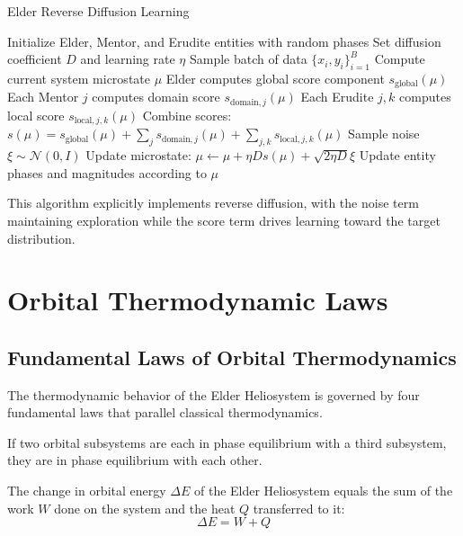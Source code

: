 \begin{algorithm}[h]
\caption{Elder Reverse Diffusion Learning}
\begin{algorithmic}[1]
\State Initialize Elder, Mentor, and Erudite entities with random phases
\State Set diffusion coefficient $D$ and learning rate $\eta$
\State Sample batch of data $\{x_i, y_i\}_{i=1}^B$
\State Compute current system microstate $\mu$
\State Elder computes global score component $s_{\text{global}}(\mu)$
\State Each Mentor $j$ computes domain score $s_{\text{domain},j}(\mu)$
\State Each Erudite $j,k$ computes local score $s_{\text{local},j,k}(\mu)$
\State Combine scores: $s(\mu) = s_{\text{global}}(\mu) + \sum_j s_{\text{domain},j}(\mu) + \sum_{j,k} s_{\text{local},j,k}(\mu)$
\State Sample noise $\xi \sim \mathcal{N}(0, I)$
\State Update microstate: $\mu \leftarrow \mu + \eta D s(\mu) + \sqrt{2\eta D} \xi$
\State Update entity phases and magnitudes according to $\mu$
\EndWhile
\end{algorithmic}
\end{algorithm}

This algorithm explicitly implements reverse diffusion, with the noise term maintaining exploration while the score term drives learning toward the target distribution.

\section{Orbital Thermodynamic Laws}

\subsection{Fundamental Laws of Orbital Thermodynamics}

The thermodynamic behavior of the Elder Heliosystem is governed by four fundamental laws that parallel classical thermodynamics.

\begin{theorem}
If two orbital subsystems are each in phase equilibrium with a third subsystem, they are in phase equilibrium with each other.
\end{theorem}

\begin{theorem}
The change in orbital energy $\Delta E$ of the Elder Heliosystem equals the sum of the work $W$ done on the system and the heat $Q$ transferred to it:
\begin{equation}
\Delta E = W + Q
\end{equation}
\end{theorem}


